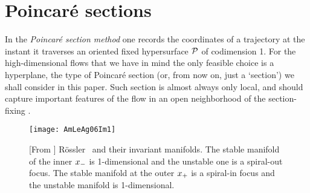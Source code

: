 
\section{Poincar\'e sections}
\label{s:cut}

In the {\em Poincar\'e section method} one records the coordinates of a
trajectory at the instant it traverses an oriented fixed hypersurface
${\cal P}$ of codimension 1. For the high-dimensional flows that we have in
mind the only feasible choice is a hyperplane, the type of Poincar\'e
section (or, from now on, just a `section')  we shall consider in this
paper. Such section is almost always only local, and should
capture important features of the flow in an open neighborhood of the
section-fixing \template.

\begin{figure}
  \texttt{[image: AmLeAg06Im1]}
    \caption{[From ]
R\"ossler \eqva\ and their invariant manifolds. The stable manifold of
the inner {\eqv} $x_{-}$  is 1-dimensional and the unstable one is a
spiral-out focus. The stable manifold at the outer {\eqv} $x_{+}$ is a
spiral-in focus and the unstable manifold is 1-dimensional.
    }
\label{fig:AmLeAg06Im1}
\end{figure}

